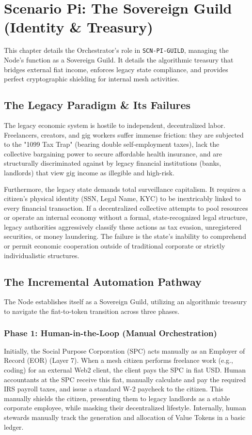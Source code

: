 \chapter{Scenario Pi: The Sovereign Guild (Identity \& Treasury)}
\label{ch:scenario_pi}

This chapter details the Orchestrator's role in \texttt{SCN-PI-GUILD}, managing the Node's function as a Sovereign Guild. It details the algorithmic treasury that bridges external fiat income, enforces legacy state compliance, and provides perfect cryptographic shielding for internal mesh activities.

\section{The Legacy Paradigm \& Its Failures}
The legacy economic system is hostile to independent, decentralized labor. Freelancers, creators, and gig workers suffer immense friction: they are subjected to the "1099 Tax Trap" (bearing double self-employment taxes), lack the collective bargaining power to secure affordable health insurance, and are structurally discriminated against by legacy financial institutions (banks, landlords) that view gig income as illegible and high-risk. 

Furthermore, the legacy state demands total surveillance capitalism. It requires a citizen's physical identity (SSN, Legal Name, KYC) to be inextricably linked to every financial transaction. If a decentralized collective attempts to pool resources or operate an internal economy without a formal, state-recognized legal structure, legacy authorities aggressively classify these actions as tax evasion, unregistered securities, or money laundering. The failure is the state's inability to comprehend or permit economic cooperation outside of traditional corporate or strictly individualistic structures.

\section{The Incremental Automation Pathway}
The Node establishes itself as a Sovereign Guild, utilizing an algorithmic treasury to navigate the fiat-to-token transition across three phases.

\subsection{Phase 1: Human-in-the-Loop (Manual Orchestration)}
Initially, the Social Purpose Corporation (SPC) acts manually as an Employer of Record (EOR) (Layer 7). When a mesh citizen performs freelance work (e.g., coding) for an external Web2 client, the client pays the SPC in fiat USD. Human accountants at the SPC receive this fiat, manually calculate and pay the required IRS payroll taxes, and issue a standard W-2 paycheck to the citizen. This manually shields the citizen, presenting them to legacy landlords as a stable corporate employee, while masking their decentralized lifestyle. Internally, human stewards manually track the generation and allocation of Value Tokens in a basic ledger.

